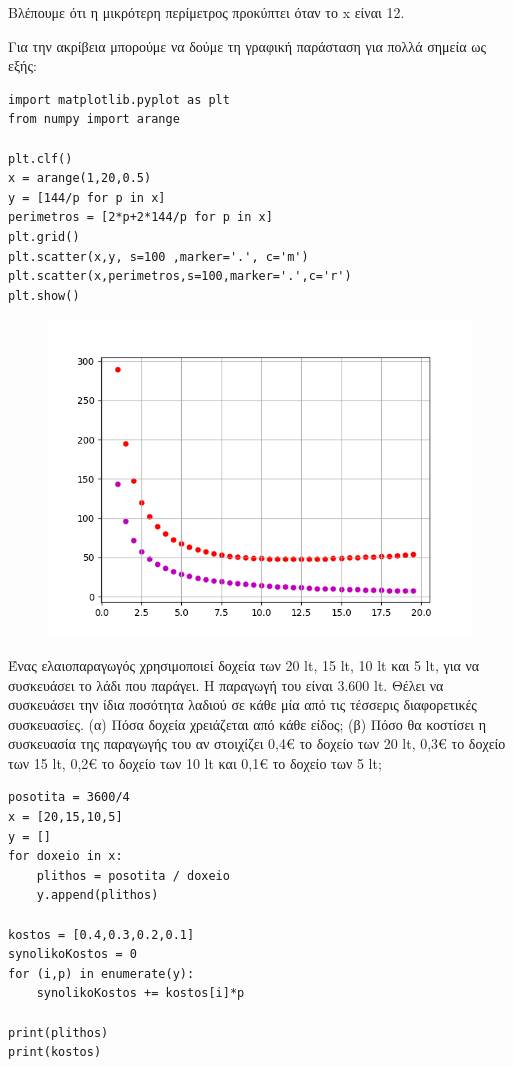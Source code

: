 Βλέπουμε ότι η μικρότερη περίμετρος προκύπτει όταν το x είναι 12.


Για την ακρίβεια μπορούμε να δούμε τη γραφική παράσταση για πολλά σημεία ως εξής:
\begin{lstlisting}
import matplotlib.pyplot as plt
from numpy import arange

plt.clf()
x = arange(1,20,0.5)
y = [144/p for p in x]
perimetros = [2*p+2*144/p for p in x]
plt.grid()
plt.scatter(x,y, s=100 ,marker='.', c='m')
plt.scatter(x,perimetros,s=100,marker='.',c='r')
plt.show()
\end{lstlisting}
\begin{figure}
\includegraphics{graph8.png}
\end{figure}
\begin{exercise}
Ένας ελαιοπαραγωγός χρησιμοποιεί δοχεία των 20 lt, 15 lt, 10 lt και 5 lt, για να συσκευάσει το λάδι που παράγει. Η παραγωγή του είναι 3.600 lt. Θέλει να συσκευάσει την ίδια ποσότητα λαδιού σε κάθε μία από τις τέσσερις διαφορετικές συσκευασίες. (α)  Πόσα δοχεία χρειάζεται από κάθε είδος; (β)  Πόσο θα κοστίσει η συσκευασία της παραγωγής του αν στοιχίζει 0,4€ το δοχείο  των 20 lt, 0,3€ το δοχείο των 15 lt,  0,2€ το δοχείο των 10 lt και 0,1€ το δοχείο  των 5 lt; 
\end{exercise}
\begin{lstlisting}
posotita = 3600/4
x = [20,15,10,5]
y = []
for doxeio in x:
    plithos = posotita / doxeio
    y.append(plithos)

kostos = [0.4,0.3,0.2,0.1]
synolikoKostos = 0
for (i,p) in enumerate(y):
    synolikoKostos += kostos[i]*p

print(plithos)
print(kostos)
\end{lstlisting}
